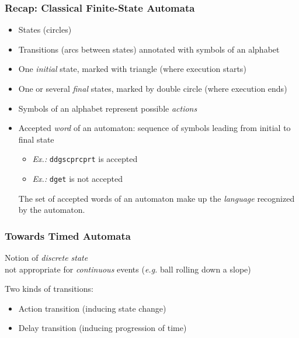 \documentclass{beamer}
\begin{document}
\begin{frame}[fragile]\frametitle{Recap: Classical Finite-State Automata}
  
  \begin{itemize}
  \item States (circles)
  \item Transitions (arcs between states) annotated with symbols of an alphabet
  \item One \emph{initial} state, marked with triangle (where execution starts)
  \item One or several \emph{final} states, marked by double circle (where execution ends)
  \end{itemize}


  \begin{itemize}
  \item Symbols of an alphabet represent possible \emph{actions}
  \item Accepted \emph{word} of an automaton: sequence of symbols leading from initial to final state
    \begin{itemize}
    \item \emph{Ex.:}  \texttt{ddgscprcprt} is accepted
    \item \emph{Ex.:} \texttt{dget} is not accepted
    \end{itemize}
    The set of accepted words of an automaton make up the \emph{language} recognized by the automaton. 
  \end{itemize}

\end{frame}


\begin{frame}[fragile]\frametitle{Towards Timed Automata}

   Notion of \emph{discrete state}\\
    not appropriate for \emph{continuous} events (\emph{e.g.} ball rolling down a slope)


   Two kinds of transitions:
  \begin{itemize}
  \item Action transition (inducing state change)
  \item Delay transition (inducing progression of time)
  \end{itemize}
  
\end{frame}
\end{document}
